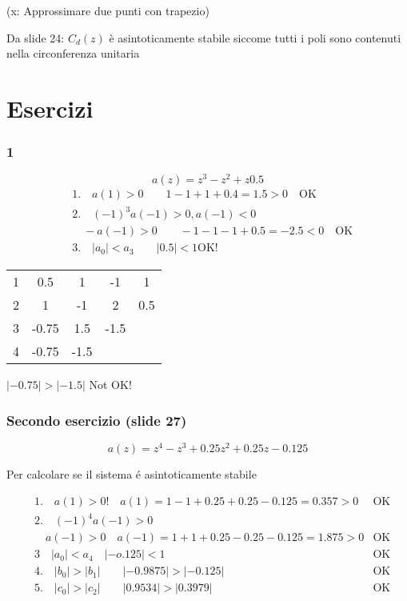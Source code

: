 \documentclass{article}
\begin{document}
(x: Approssimare due  punti con trapezio)

Da slide 24: $C_d(z)$ \`e asintoticamente stabile siccome tutti i poli sono contenuti nella circonferenza unitaria






\newpage
\section{Esercizi}


\subsubsection{1}

\[ a(z) = z^3 - z^2 + z  0.5 \]
\[
\begin{align*}
    &1.\quad a(1) > 0 \qquad 1 - 1 + 1 + 0.4 = 1.5 > 0 \quad \text{OK}\\
    &2.\quad (-1)^3 a(-1) > 0, a(-1) < 0\\
    & \quad -a(-1) > 0 \qquad -1 -1 -1 +0.5 = -2.5 < 0 \quad \text{OK}\\
    &3.\quad  |a_0| < a_3 \qquad |0.5| < 1 \text{OK!}
\end{align*}
\]

\begin{tabular}{c|c c c c}
    1 & 0.5 & 1&  -1 & 1\\
    2 & 1 & -1 & 2 & 0.5\\
    3 & -0.75 & 1.5 & -1.5\\
    4 & -0.75 & -1.5 & &
\end{tabular}

\bigbreak
$|-0.75| > |-1.5|$ Not OK!

\subsubsection{Secondo esercizio (slide 27)}

\[ a(z) = z^4 - z^3 + 0.25 z^2 + 0.25 z - 0.125 \]

Per calcolare se il sistema \'e asintoticamente stabile

\begin{align*}
    &1.\quad  a(1) > 0! \quad a(1) = 1 -1 + 0.25 + 0.25 - 0.125 = 0.357 > 0 & \text{OK}\\
    &2. \quad (-1) ^4 a(-1) > 0 \\
    & \quad a(-1) > 0 \quad a(-1) = 1 + 1 + 0.25 - 0.25 -0.125 = 1.875 > 0 & \text{OK}\\
    &3 \quad |a_0| < a_4 \quad |-o.125| < 1 & \text{OK} \\
    & 4. \quad |b_0| > |b_1| \qquad |-0.9875| > |-0.125| & \text{OK}\\
    & 5.\quad  |c_0| > |c_2| \qquad |0.9534| > |0.3979| & \text{OK}\\
\end{align*}
\end{document}
